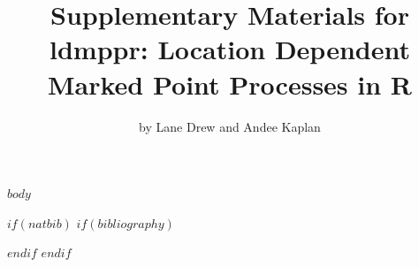 \documentclass[a4paper]{report}
\begin{document}


\begin{article}
\title{Supplementary Materials for ldmppr: Location Dependent Marked Point Processes in R}


\author{by Lane Drew and Andee Kaplan}

\maketitle

$body$

$if(natbib)$
$if(bibliography)$


$endif$
$endif$
\end{article}
\end{document}
